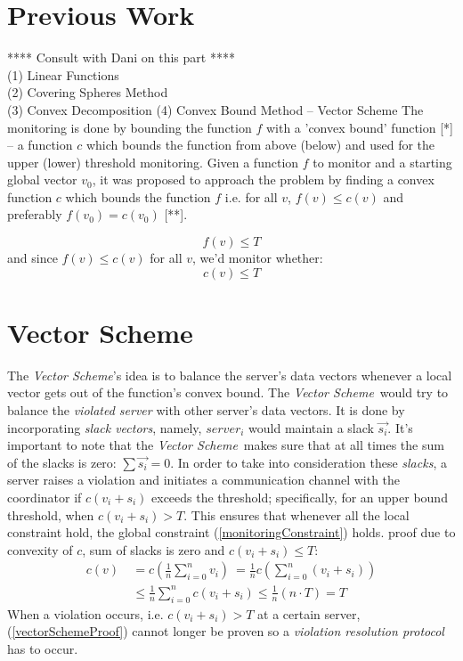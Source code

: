 \documentclass[10pt, conference]{IEEEtran}
\newcommand{\vectorScheme}{\textit{Vector Scheme}}
\begin{document}
\section{Previous Work}
**** Consult with Dani on this part **** \\
(1) Linear Functions \\
(2) Covering Spheres Method \\
(3) Convex Decomposition
(4) Convex Bound Method -- Vector Scheme
The monitoring is done by bounding the function $f$ with a 'convex bound' function [*] -- a function $c$ which bounds the function from above (below) and used for the upper (lower) threshold monitoring.
Given a function $f$ to monitor and a starting global vector $v_0$, it was proposed to approach the problem by finding a convex function $c$ which bounds the function $f$ i.e. for all $v$, ${f(v) \leq c(v)}$ and preferably ${f(v_0)=c(v_0)}$ [**]. 


\begin{equation}
f(v) \leq T
\end{equation}
and since ${f(v) \leq c(v)}$ for all $v$, we'd monitor whether:
\begin{equation}
\label{monitoringConstraint}
c(v) \leq T
\end{equation}

\section{Vector Scheme}
The \vectorScheme 's idea is to balance the server's data vectors whenever a local vector gets out of the function's convex bound. The \vectorScheme \ would try to balance the \textit{violated server} with other server's data vectors. It is done by incorporating \textit{slack vectors}, namely, $server_i$ would maintain a slack $\overrightarrow{s_i}$. It's important to note that the \vectorScheme \  makes sure that at all times the sum of the slacks is zero: ${\sum{\overrightarrow{s_i}} = 0}$.
In order to take into consideration these \textit{slacks}, a server raises a violation and initiates a communication channel with the coordinator if ${c(v_i+s_i)}$ exceeds the threshold; specifically, for an upper bound threshold, when ${c(v_i+s_i) > T}$. This ensures that whenever all the local constraint hold, the global constraint (\ref{monitoringConstraint}) holds. proof due to convexity of $c$, sum of slacks is zero and ${c(v_i+s_i) \leq T}$:
\begin{equation}
\label{vectorSchemeProof}
\begin{aligned}
 c(v)  \
	   &=  c\left(\frac{1}{n} \sum\limits_{i=0}^{n}{v_i}\right)  \
        =  \frac{1}{n} c\left(\sum\limits_{i=0}^{n}{(v_i + s_i)}\right) \\
      &\leq   \frac{1}{n} \sum\limits_{i=0}^{n}{c(v_i + s_i)}
       \leq   \frac{1}{n}(n \cdot T)
       = T
\end{aligned}
\end{equation}
When a violation occurs, i.e. ${c(v_i+s_i) > T}$ at a certain server, (\ref{vectorSchemeProof}) cannot longer be proven so a \textit{violation resolution protocol} has to occur.
\end{document}
